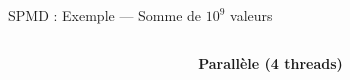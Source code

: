 \documentclass[../main.tex]{subfiles}
\begin{document}
\begin{frame}{SPMD : Exemple --- Somme de $10^9$ valeurs}
\begin{columns}
\begin{column}{.33\linewidth}
    \end{column}
    \begin{column}{.66\linewidth}
      \begin{overlayarea}{\linewidth}{.85\textheight}
        \centering
        \textbf{Parallèle (4 threads)} \vspace{.03\textheight}


\end{overlayarea}
\end{column}
\end{columns}
\end{frame}
\end{document}
